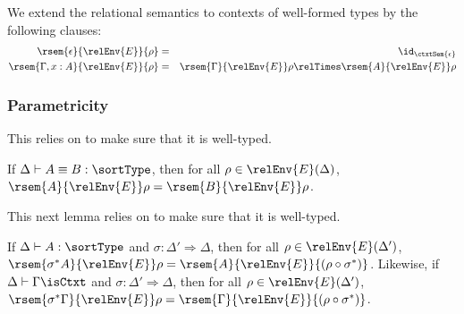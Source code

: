 We extend the relational semantics to contexts of well-formed types by
the following clauses:
\begin{eqnarray*}
  \rsem{\epsilon}{\relEnv{E}}{\rho} & = & \id_{\ctxtSem{\epsilon}} \\
  \rsem{\Gamma, x : A}{\relEnv{E}}{\rho} & = & \rsem{\Gamma}{\relEnv{E}}\rho \relTimes \rsem{A}{\relEnv{E}}\rho
\end{eqnarray*}

\subsubsection{Parametricity}

This relies on  to make sure that it is
well-typed.

\begin{lemma}\label{lem:tyeq-rel}
  If $\Delta \vdash A \equiv B : \sortType$, then for all $\rho \in
  \relEnv{E}(\Delta)$, $\rsem{A}{\relEnv{E}}\rho = \rsem{B}{\relEnv{E}}\rho$.
\end{lemma}

This next lemma relies on  to make sure
that it is well-typed.

\begin{lemma}\label{lem:tysubst-rel}
  If $\Delta \vdash A : \sortType$ and $\sigma : \Delta' \Rightarrow
  \Delta$, then for all $\rho \in \relEnv{E}(\Delta')$,
  $\rsem{\sigma^*A}{\relEnv{E}}\rho = \rsem{A}{\relEnv{E}}{(\rho \circ \sigma^*)}$. Likewise,
  if $\Delta \vdash \Gamma \isCtxt$ and $\sigma : \Delta' \Rightarrow
  \Delta$, then for all $\rho \in \relEnv{E}(\Delta')$,
  $\rsem{\sigma^*\Gamma}{\relEnv{E}}\rho = \rsem{\Gamma}{\relEnv{E}}{(\rho \circ \sigma^*)}$.
\end{lemma}

